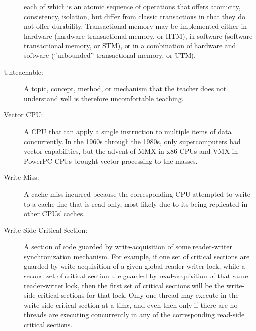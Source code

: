 \begin{description}
	each of which is an atomic sequence of operations
	that offers atomicity, consistency, isolation, but differ from
	classic transactions in that they do not offer
	durability.
	Transactional memory may be implemented either in hardware
	(hardware transactional memory, or HTM), in software (software
	transactional memory, or STM), or in a combination of hardware
	and software (``unbounded'' transactional memory, or UTM).
\item[Unteachable:]
	A topic, concept, method, or mechanism that the teacher does
	not understand well is therefore uncomfortable teaching.
\item[Vector CPU:]
	A CPU that can apply a single instruction to multiple items of
	data concurrently.
	In the 1960s through the 1980s, only supercomputers had vector
	capabilities, but the advent of MMX in x86 CPUs and VMX in
	PowerPC CPUs brought vector processing to the masses.
\item[Write Miss:]
	A cache miss incurred because the corresponding CPU attempted
	to write to a cache line that is read-only, most likely due
	to its being replicated in other CPUs' caches.
\item[Write-Side Critical Section:]
	A section of code guarded by write-acquisition of
	some reader-writer synchronization mechanism.
	For example, if one set of critical sections are guarded by
	write-acquisition of
	a given global reader-writer lock, while a second set of critical
	section are guarded by read-acquisition of that same reader-writer
	lock, then the first set of critical sections will be the
	write-side critical sections for that lock.
	Only one thread may execute in the write-side critical section
	at a time, and even then only if there are no threads are
	executing concurrently in any of the corresponding read-side
	critical sections.
\end{description}
